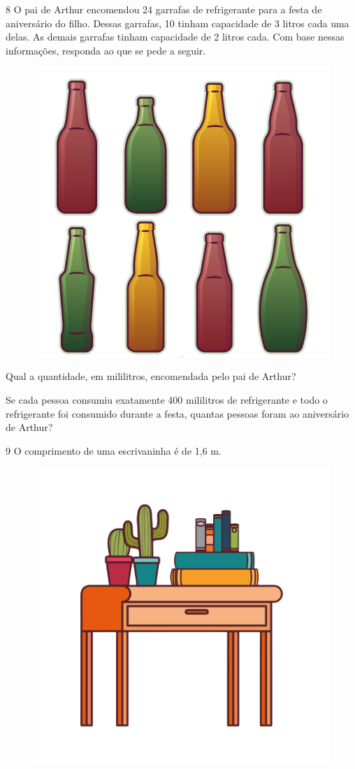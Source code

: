 \num{8} O pai de Arthur encomendou 24 garrafas de
refrigerante para a festa de aniversário do filho. Dessas garrafas, 10 tinham capacidade de 3 litros cada uma delas. As demais garrafas tinham capacidade de 2 litros cada. Com base nessas
informações, responda ao que se pede a seguir.

\begin{figure}[htpb!]
\centering
\includegraphics[width=.6\textwidth]{./media/image47a.png}
\end{figure}

\begin{escolha}
\item Qual a quantidade, em mililitros, encomendada pelo pai de Arthur?

\item Se cada pessoa consumiu exatamente 400 mililitros de refrigerante e
  todo o refrigerante foi consumido durante a festa, quantas pessoas
  foram ao aniversário de Arthur?
\end{escolha}

\num{9} O comprimento de uma escrivaninha é de 1,6 m. 

\begin{figure}[htpb!]
\centering
\includegraphics[width=.5\textwidth]{./media/image47b.png}
\end{figure}

